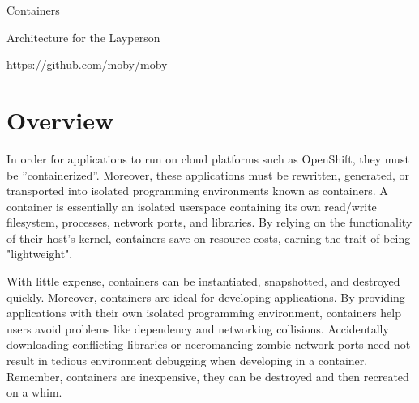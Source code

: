 \documentclass{article}
\begin{document}
      
\centerline{\sc \large Containers}
\centerline{\sc Architecture for the Layperson }
\centerline{\url{https://github.com/moby/moby}}

\vspace{1pc}
\section{Overview}

\hspace{3pc} 
In order for applications to run on cloud platforms such as OpenShift, they must be ”containerized”. 
Moreover, these applications must be rewritten, generated, or transported into isolated programming 
environments known as containers. A container is essentially an isolated userspace containing its 
own read/write filesystem, processes, network ports, and libraries. By relying on the functionality 
of their host's kernel, containers save on resource costs, earning the trait of being "lightweight".
\begin{figure}
\end{figure}

With little expense, containers can be instantiated, snapshotted, and destroyed quickly. Moreover, 
containers are 
ideal for developing applications. By providing applications with their own isolated programming 
environment, containers help users avoid problems like dependency and networking collisions. 
Accidentally downloading conflicting libraries or necromancing zombie network ports need not result 
in tedious environment debugging when developing in a container. Remember, containers are inexpensive,
 they can be destroyed and then recreated on a whim. 
\end{document}

